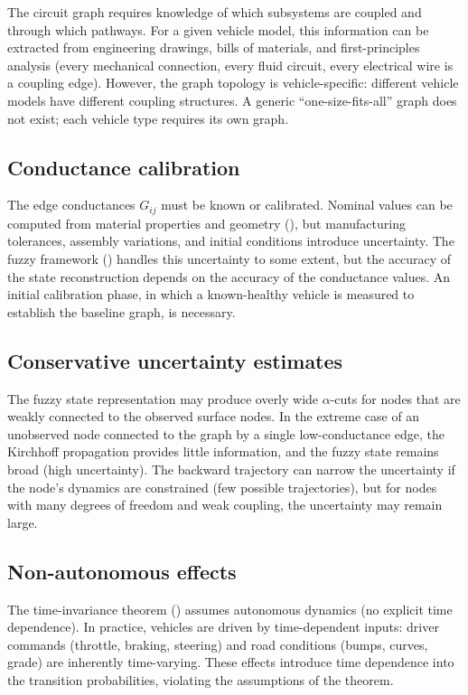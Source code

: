 \documentclass[twocolumn,10pt,a4paper]{article}
\theoremstyle{definition}
\theoremstyle{remark}
\begin{document}
The circuit graph requires knowledge of which subsystems are coupled and through which pathways. For a given vehicle model, this information can be extracted from engineering drawings, bills of materials, and first-principles analysis (every mechanical connection, every fluid circuit, every electrical wire is a coupling edge). However, the graph topology is vehicle-specific: different vehicle models have different coupling structures. A generic ``one-size-fits-all'' graph does not exist; each vehicle type requires its own graph.

\subsection{Conductance calibration}

The edge conductances $G_{ij}$ must be known or calibrated. Nominal values can be computed from material properties and geometry (), but manufacturing tolerances, assembly variations, and initial conditions introduce uncertainty. The fuzzy framework () handles this uncertainty to some extent, but the accuracy of the state reconstruction depends on the accuracy of the conductance values. An initial calibration phase, in which a known-healthy vehicle is measured to establish the baseline graph, is necessary.

\subsection{Conservative uncertainty estimates}

The fuzzy state representation may produce overly wide $\alpha$-cuts for nodes that are weakly connected to the observed surface nodes. In the extreme case of an unobserved node connected to the graph by a single low-conductance edge, the Kirchhoff propagation provides little information, and the fuzzy state remains broad (high uncertainty). The backward trajectory can narrow the uncertainty if the node's dynamics are constrained (few possible trajectories), but for nodes with many degrees of freedom and weak coupling, the uncertainty may remain large.

\subsection{Non-autonomous effects}

The time-invariance theorem () assumes autonomous dynamics (no explicit time dependence). In practice, vehicles are driven by time-dependent inputs: driver commands (throttle, braking, steering) and road conditions (bumps, curves, grade) are inherently time-varying. These effects introduce time dependence into the transition probabilities, violating the assumptions of the theorem.
\end{document}
